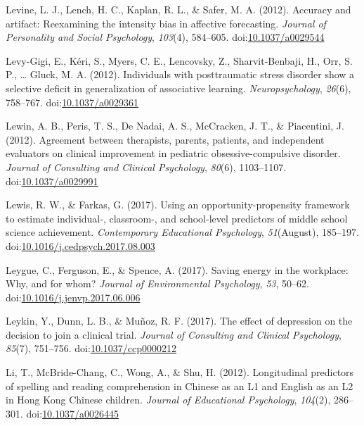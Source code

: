 \documentclass[english,man]{apa6}
\theoremstyle{definition}
\theoremstyle{definition}
\theoremstyle{definition}
\theoremstyle{remark}
\begin{document}
\hypertarget{ref-Levine2012}{}
Levine, L. J., Lench, H. C., Kaplan, R. L., \& Safer, M. A. (2012).
Accuracy and artifact: Reexamining the intensity bias in affective
forecasting. \emph{Journal of Personality and Social Psychology},
\emph{103}(4), 584--605.
doi:\href{https://doi.org/10.1037/a0029544}{10.1037/a0029544}

\hypertarget{ref-Levy-Gigi2012}{}
Levy-Gigi, E., Kéri, S., Myers, C. E., Lencovsky, Z., Sharvit-Benbaji,
H., Orr, S. P., \ldots{} Gluck, M. A. (2012). Individuals with
posttraumatic stress disorder show a selective deficit in generalization
of associative learning. \emph{Neuropsychology}, \emph{26}(6), 758--767.
doi:\href{https://doi.org/10.1037/a0029361}{10.1037/a0029361}

\hypertarget{ref-Lewin2012}{}
Lewin, A. B., Peris, T. S., De Nadai, A. S., McCracken, J. T., \&
Piacentini, J. (2012). Agreement between therapists, parents, patients,
and independent evaluators on clinical improvement in pediatric
obsessive-compulsive disorder. \emph{Journal of Consulting and Clinical
Psychology}, \emph{80}(6), 1103--1107.
doi:\href{https://doi.org/10.1037/a0029991}{10.1037/a0029991}

\hypertarget{ref-Lewis2017}{}
Lewis, R. W., \& Farkas, G. (2017). Using an opportunity-propensity
framework to estimate individual-, classroom-, and school-level
predictors of middle school science achievement. \emph{Contemporary
Educational Psychology}, \emph{51}(August), 185--197.
doi:\href{https://doi.org/10.1016/j.cedpsych.2017.08.003}{10.1016/j.cedpsych.2017.08.003}

\hypertarget{ref-Leygue2017}{}
Leygue, C., Ferguson, E., \& Spence, A. (2017). Saving energy in the
workplace: Why, and for whom? \emph{Journal of Environmental
Psychology}, \emph{53}, 50--62.
doi:\href{https://doi.org/10.1016/j.jenvp.2017.06.006}{10.1016/j.jenvp.2017.06.006}

\hypertarget{ref-Leykin2017a}{}
Leykin, Y., Dunn, L. B., \& Muñoz, R. F. (2017). The effect of
depression on the decision to join a clinical trial. \emph{Journal of
Consulting and Clinical Psychology}, \emph{85}(7), 751--756.
doi:\href{https://doi.org/10.1037/ccp0000212}{10.1037/ccp0000212}

\hypertarget{ref-Li2012a}{}
Li, T., McBride-Chang, C., Wong, A., \& Shu, H. (2012). Longitudinal
predictors of spelling and reading comprehension in Chinese as an L1 and
English as an L2 in Hong Kong Chinese children. \emph{Journal of
Educational Psychology}, \emph{104}(2), 286--301.
doi:\href{https://doi.org/10.1037/a0026445}{10.1037/a0026445}
\end{document}
